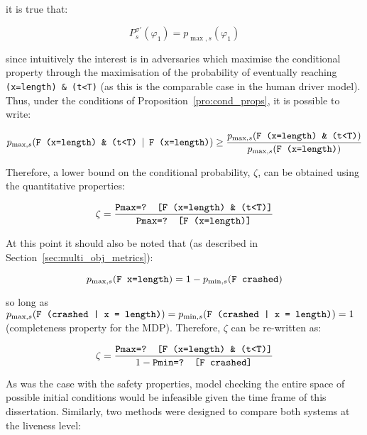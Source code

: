 it is true that:

\begin{equation}
	P^{\sigma'}_s (\varphi_1) = p_{\max, s} (\varphi_1)
\end{equation}

since intuitively the interest is in adversaries which maximise the conditional property through the maximisation of the probability of eventually reaching \texttt{(x=length) \& (t<T)} (as this is the comparable case in the human driver model). Thus, under the conditions of Proposition~\ref{pro:cond_props}, it is possible to write:

\begin{equation}
	p_{\max, s} (\text{\texttt{F (x=length) \& (t<T)}} \:\mid\: \text{\texttt{F (x=length)}}) \geq \frac{p_{\max, s} (\text{\texttt{F (x=length) \& (t<T)}})}{p_{\max, s} (\text{\texttt{F (x=length)}})}
\end{equation}

Therefore, a lower bound on the conditional probability, $\zeta$, can be obtained using the quantitative properties:

\begin{equation}
	\zeta = \frac{\text{\texttt{Pmax=? [F (x=length) \& (t<T)]}}}{\text{\texttt{Pmax=? [F (x=length)]}}}
\end{equation}

At this point it should also be noted that (as described in Section~\ref{sec:multi_obj_metrics}):

\begin{equation}
	p_{\max,s} (\text{\texttt{F x=length}}) = 1 - p_{\min,s} (\text{\texttt{F crashed}})
\end{equation}

so long as $p_{\max, s} (\text{\texttt{F (crashed | x = length)}}) = p_{\min, s} (\text{\texttt{F (crashed | x = length)}}) = 1$ (completeness property for the MDP). Therefore, $\zeta$ can be re-written as:

\begin{equation}
	\zeta = \frac{\text{\texttt{Pmax=? [F (x=length) \& (t<T)]}}}{1 - \text{\texttt{Pmin=? [F crashed]}}}
\end{equation}

As was the case with the safety properties, model checking the entire space of possible initial conditions would be infeasible given the time frame of this dissertation. Similarly, two methods were designed to compare both systems at the liveness level:

